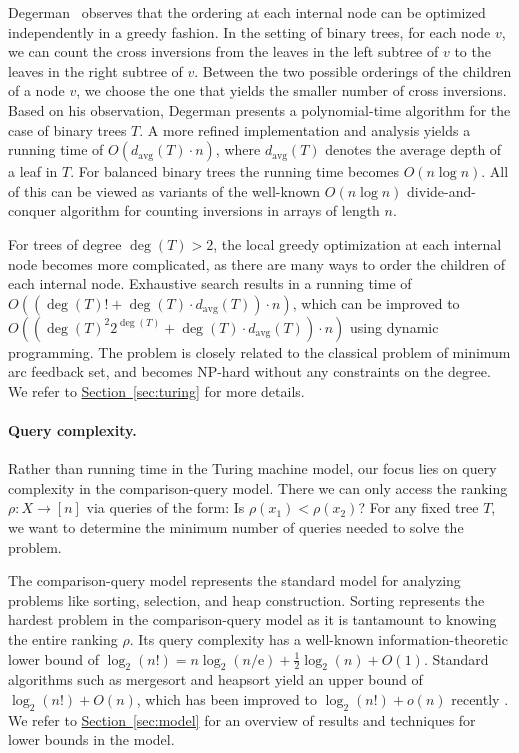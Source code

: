 \documentclass[11pt]{article}
\numberwithin{equation}{section}
\theoremstyle{definition}
\theoremstyle{plain}
\newcommand{\eee}{\mathrm e}
\newcommand{\expref}[2]{\hyperref[#2]{#1~\ref{#2}}}
\newcommand{\depth}{d}
\newcommand{\avgdepth}{\depth_\mathrm{avg}}
\newcommand{\ranking}{\rho}
\begin{document}
Degerman~\cite{Degerman1982} observes that the ordering at each internal node can be optimized %
%
independently in a greedy fashion. In the setting of binary trees, for each node $v$, we can count the cross inversions from the leaves in the left subtree of $v$ to the leaves in the right subtree of $v$. Between the two possible orderings of the children of a node $v$, we choose the one that yields the smaller number of cross inversions. 
Based on his observation, Degerman presents a polynomial-time algorithm for the case of binary trees $T$. A more refined implementation and analysis yields a running time of $O(\avgdepth(T) \cdot n)$, where $\avgdepth(T)$ denotes the average depth of a leaf in $T$. For balanced binary trees the running time becomes $O(n \log n)$. All of this can be viewed as variants of the well-known $O(n \log n)$ divide-and-conquer algorithm for counting inversions in arrays of length $n$.

For trees of degree $\deg(T) > 2$, the local greedy optimization at each internal node becomes more complicated, as there are many ways to order the children of each internal node. Exhaustive search results in a running time of $O((\deg(T)! + \deg(T) \cdot \avgdepth(T)) \cdot n)$, which can be improved to $O((\deg(T)^2 2^{\deg(T)} + \deg(T) \cdot \avgdepth(T)) \cdot n)$ using dynamic programming. The problem is closely related to the classical problem of minimum arc feedback set, and becomes NP-hard without any constraints on the degree. We refer to \expref{Section}{sec:turing} for more details.

\paragraph{Query complexity.}
Rather than running time in the Turing machine model, our focus lies on query complexity in the comparison-query model. There we can only access the ranking $\ranking: X \to [n]$ via queries of the form: Is $\ranking(x_1) < \ranking(x_2)$? For any fixed tree $T$, we want to determine the minimum number of queries needed to solve the problem. 

The comparison-query model represents the standard model for analyzing problems like sorting, selection, and heap construction. Sorting represents the hardest problem in the comparison-query model as it is tantamount to knowing the entire ranking $\ranking$. Its query complexity has a well-known information-theoretic lower bound of $\log_2(n!) = n \log_2(n/\eee) + \frac{1}{2} \log_2(n) + O(1)$. Standard algorithms such as mergesort and heapsort yield an upper bound of $\log_2(n!) + O(n)$, which has been improved to $\log_2(n!) + o(n)$ recently \cite{Sergeev2020}.
We refer to \expref{Section}{sec:model} for an overview of results and techniques for lower bounds in the model.
\end{document}

